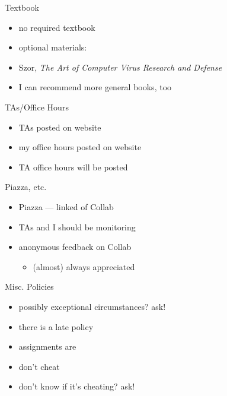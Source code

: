 \begin{frame}{Textbook}
    \begin{itemize}
    \item no required textbook
    \item optional materials:
    \item Szor, \textit{The Art of Computer Virus Research and Defense}
    \item I can recommend more general books, too
    \end{itemize}
\end{frame}

\begin{frame}{TAs/Office Hours}
    \begin{itemize}
    \item TAs posted on website
    \item my office hours posted on website
    \item TA office hours will be posted
    \end{itemize}
\end{frame}

\begin{frame}{Piazza, etc.}
    \begin{itemize}
    \item Piazza --- linked of Collab
    \item TAs and I should be monitoring
    \vspace{.5cm}
    \item anonymous feedback on Collab
        \begin{itemize}
        \item (almost) always appreciated
        \end{itemize}
    \end{itemize}
\end{frame}

\begin{frame}{Misc. Policies}
    \begin{itemize}
    \item possibly exceptional circumstances? ask!
    \item there is a late policy
    \item assignments are 
    \item don't cheat
    \item don't know if it's cheating? ask!
    \end{itemize}
\end{frame}

